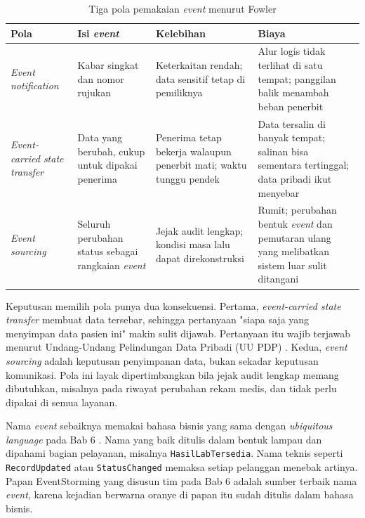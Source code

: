 \begin{table}[!htb]
  \centering
  \caption{Tiga pola pemakaian \textit{event} menurut Fowler \cite{c09-fowler2017}}
  \label{tab:ch09-pola-event}
  \footnotesize
  \begin{tabularx}{\textwidth}{>{\raggedright\arraybackslash}p{2.1cm} >{\raggedright\arraybackslash}X >{\raggedright\arraybackslash}X >{\raggedright\arraybackslash}X}
    \hline
    \textbf{Pola} & \textbf{Isi \textit{event}} & \textbf{Kelebihan} & \textbf{Biaya} \\ \hline
    \textit{Event notification} & Kabar singkat dan nomor rujukan & Keterkaitan rendah; data
      sensitif tetap di pemiliknya & Alur logis tidak terlihat di satu tempat; panggilan balik
      menambah beban penerbit \\ \hline
    \textit{Event-carried state transfer} & Data yang berubah, cukup untuk dipakai penerima & Penerima
      tetap bekerja walaupun penerbit mati; waktu tunggu pendek & Data tersalin di banyak tempat;
      salinan bisa sementara tertinggal; data pribadi ikut menyebar \\ \hline
    \textit{Event sourcing} & Seluruh perubahan status sebagai rangkaian \textit{event} & Jejak audit
      lengkap; kondisi masa lalu dapat direkonstruksi & Rumit; perubahan bentuk \textit{event} dan
      pemutaran ulang yang melibatkan sistem luar sulit ditangani \\ \hline
  \end{tabularx}
\end{table}

Keputusan memilih pola punya dua konsekuensi. Pertama, \textit{event-carried state transfer}
membuat data tersebar, sehingga pertanyaan "siapa saja yang menyimpan data pasien ini" makin sulit
dijawab. Pertanyaan itu wajib terjawab menurut Undang-Undang Pelindungan Data Pribadi (UU PDP)
\cite{uu27-2022-pdp}. Kedua, \textit{event sourcing} adalah keputusan penyimpanan data, bukan
sekadar keputusan komunikasi. Pola ini layak dipertimbangkan bila jejak audit lengkap memang
dibutuhkan, misalnya pada riwayat perubahan rekam medis, dan tidak perlu dipakai di semua layanan.

Nama \textit{event} sebaiknya memakai bahasa bisnis yang sama dengan \textit{ubiquitous language}
pada Bab 6 \cite{evans2003}. Nama yang baik ditulis dalam bentuk lampau dan dipahami bagian
pelayanan, misalnya \texttt{HasilLabTersedia}. Nama teknis seperti \texttt{RecordUpdated} atau
\texttt{StatusChanged} memaksa setiap pelanggan menebak artinya. Papan EventStorming yang disusun
tim pada Bab 6 adalah sumber terbaik nama \textit{event}, karena kejadian berwarna oranye di papan
itu sudah ditulis dalam bahasa bisnis.

